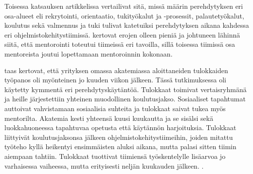 \documentclass[utf8]{gradu3}
\begin{document}
Toisessa katsauksen artikkelissa \textcite{moe-ym-2020} vertailivat sitä, missä määrin perehdytyksen eri osa-alueet eli rekrytointi, orientaatio, tukityökalut ja -prosessit, palautetyökalut, koulutus sekä valmennus ja tuki \parencite{bauer-2010} tulivat katetuiksi perehdytyksen aikana kahdessa eri ohjelmistokehitystiimissä. \textcite{moe-ym-2020} kertovat erojen olleen pieniä ja johtuneen lähinnä siitä, että mentorointi toteutui tiimeissä eri tavoilla, sillä toisessa tiimissä osa mentoreista joutui lopettamaan mentoroinnin kokonaan.

\textcite{shannon-pool-2016} taas kertovat, että yrityksen omassa akatemiassa aloittaneiden tulokkaiden työpanos oli myönteinen jo kuuden viikon jälkeen. Tässä tutkimuksessa oli käytetty kymmentä eri perehdytyskäytäntöä. Tulokkaat toimivat vertaisryhmänä ja heille järjestettiin yhteinen muodollinen koulutusjakso. Sosiaaliset tapahtumat auttoivat vahvistamaan sosiaalisia suhteita ja tulokkaat saivat tukea myös mentorilta. Akatemia kesti yhteensä kuusi kuukautta ja se sisälsi sekä luokkahuoneessa tapahtuvaa opetusta että käytännön harjoituksia. Tulokkaat liittyivät koulutusjaksonsa jälkeen ohjelmistokehitystiimeihin, joiden mitattu työteho kyllä heikentyi ensimmäisten aluksi aikana, mutta palasi sitten tiimin aiempaan tahtiin. Tulokkaat tuottivat tiimiensä työskentelylle lisäarvoa jo varhaisessa vaiheessa, mutta erityisesti neljän kuukauden jälkeen. \parencite{shannon-pool-2016}.
\end{document}
